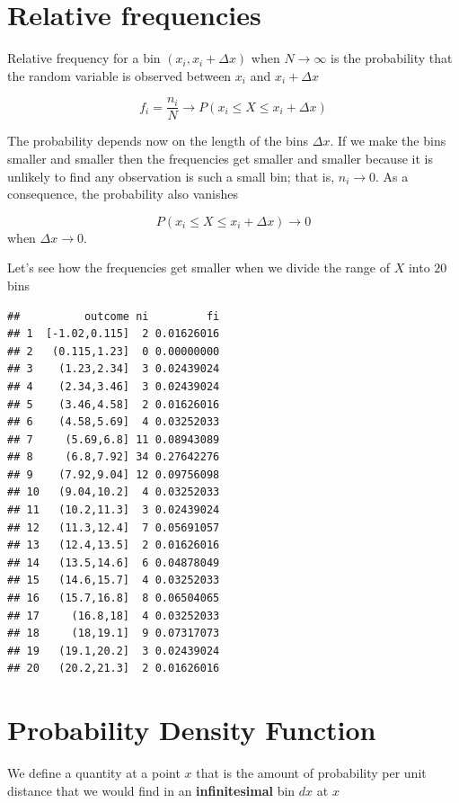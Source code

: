 \documentclass[
]{book}
\begin{document}
\hypertarget{relative-frequencies-3}{%
\section{Relative frequencies}\label{relative-frequencies-3}}

Relative frequency for a bin \((x_i, x_i + \Delta x)\) when \(N \rightarrow \infty\) is the probability that the random variable is observed between \(x_i\) and \(x_i + \Delta x\)

\[f_i=\frac{n_i}{N} \rightarrow P(x_i \leq X  \leq x_i + \Delta x)\]

The probability depends now on the length of the bins \(\Delta x\). If we make the bins smaller and smaller then the frequencies get smaller and smaller because it is unlikely to find any observation is such a small bin; that is, \(n_i \rightarrow 0\). As a consequence, the probability also vanishes

\[P(x_i \leq X  \leq x_i + \Delta x) \rightarrow 0\] when \(\Delta x \rightarrow 0\).

Let's see how the frequencies get smaller when we divide the range of \(X\) into \(20\) bins

\begin{verbatim}
##          outcome ni         fi
## 1  [-1.02,0.115]  2 0.01626016
## 2   (0.115,1.23]  0 0.00000000
## 3    (1.23,2.34]  3 0.02439024
## 4    (2.34,3.46]  3 0.02439024
## 5    (3.46,4.58]  2 0.01626016
## 6    (4.58,5.69]  4 0.03252033
## 7     (5.69,6.8] 11 0.08943089
## 8     (6.8,7.92] 34 0.27642276
## 9    (7.92,9.04] 12 0.09756098
## 10   (9.04,10.2]  4 0.03252033
## 11   (10.2,11.3]  3 0.02439024
## 12   (11.3,12.4]  7 0.05691057
## 13   (12.4,13.5]  2 0.01626016
## 14   (13.5,14.6]  6 0.04878049
## 15   (14.6,15.7]  4 0.03252033
## 16   (15.7,16.8]  8 0.06504065
## 17     (16.8,18]  4 0.03252033
## 18     (18,19.1]  9 0.07317073
## 19   (19.1,20.2]  3 0.02439024
## 20   (20.2,21.3]  2 0.01626016
\end{verbatim}

\hypertarget{probability-density-function}{%
\section{Probability Density Function}\label{probability-density-function}}

We define a quantity at a point \(x\) that is the amount of probability per unit distance that we would find in an \textbf{infinitesimal} bin \(dx\) at \(x\)
\end{document}
